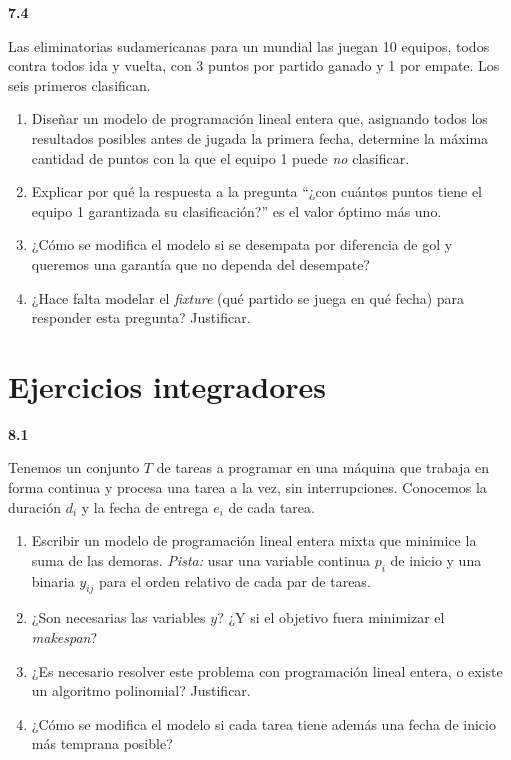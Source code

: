 \documentclass[11pt,a4paper]{article}
\newcommand{\ejercicio}[1]{\par\medskip\noindent\textbf{#1}\par\nopagebreak\smallskip}
\begin{document}
\ejercicio{7.4}
Las eliminatorias sudamericanas para un mundial las juegan 10 equipos, todos
contra todos ida y vuelta, con 3 puntos por partido ganado y 1 por empate. Los
seis primeros clasifican.
\begin{enumerate}
  \item Diseñar un modelo de programación lineal entera que, asignando todos los
  resultados posibles antes de jugada la primera fecha, determine la máxima
  cantidad de puntos con la que el equipo 1 puede \emph{no} clasificar.
  \item Explicar por qué la respuesta a la pregunta ``¿con cuántos puntos tiene
  el equipo 1 garantizada su clasificación?'' es el valor óptimo más uno.
  \item ¿Cómo se modifica el modelo si se desempata por diferencia de gol y
  queremos una garantía que no dependa del desempate?
  \item ¿Hace falta modelar el \emph{fixture} (qué partido se juega en qué
  fecha) para responder esta pregunta? Justificar.
\end{enumerate}

\section{Ejercicios integradores}

\ejercicio{8.1}
Tenemos un conjunto $T$ de tareas a programar en una máquina que trabaja en
forma continua y procesa una tarea a la vez, sin interrupciones. Conocemos la
duración $d_i$ y la fecha de entrega $e_i$ de cada tarea.
\begin{enumerate}
  \item Escribir un modelo de programación lineal entera mixta que minimice la
  suma de las demoras. \emph{Pista:} usar una variable continua $p_i$ de inicio
  y una binaria $y_{ij}$ para el orden relativo de cada par de tareas.
  \item ¿Son necesarias las variables $y$? ¿Y si el objetivo fuera minimizar el
  \emph{makespan}?
  \item ¿Es necesario resolver este problema con programación lineal entera, o
  existe un algoritmo polinomial? Justificar.
  \item ¿Cómo se modifica el modelo si cada tarea tiene además una fecha de
  inicio más temprana posible?
\end{enumerate}
\end{document}
